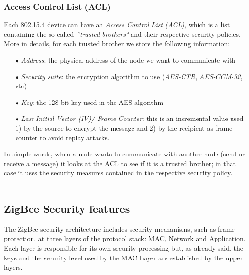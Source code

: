 \documentclass[12pt]{report}
\begin{document}
{\subsubsection{Access Control List (ACL)}
\bigskip

Each 802.15.4 device can have an \emph{Access Control List (ACL)}, which is a list containing the so-called \emph{``trusted-brothers"} and their respective security policies.\\
More in details, for each trusted brother we store the following information:

\begin{itemize}
\setlength{\itemindent}{+4mm}
\item[$\bullet$] \emph{Address}: the physical address of the node we want to communicate with
\item[$\bullet$] \emph{Security suite}: the encryption algorithm to use (\emph{AES-CTR}, \emph{AES-CCM-32}, etc)
\item[$\bullet$] \emph{Key}: the 128-bit key used in the AES algorithm
\item[$\bullet$] \emph{Last Initial Vector (IV)/ Frame Counter}: this is an incremental value used 1) by the source to encrypt the message and 2) by the recipient as frame counter to avoid replay attacks.\\
\end{itemize}

In simple words, when a node wants to communicate with another node (send or receive a message) it looks at the ACL to see if it is a trusted brother; in that case it uses the security measures contained in the respective security policy.\\\\

\subsection{ZigBee Security features}
\label{ssec:zigbeesecfeatures}
\bigskip
The ZigBee security architecture includes security mechanisms, such as frame protection, at three layers of the protocol stack: MAC, Network and Application.\\
Each layer is responsible for its own security processing but, as already said, the keys and the security level used by the MAC Layer are established by the upper layers.

}
\end{document}
